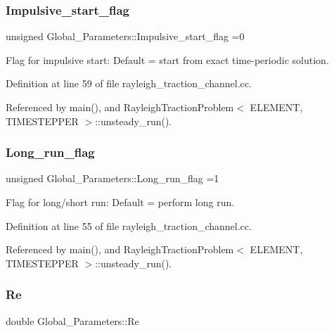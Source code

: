 \subsubsection{\texorpdfstring{Impulsive\+\_\+start\+\_\+flag}{Impulsive\_start\_flag}}
{\footnotesize\ttfamily unsigned Global\+\_\+\+Parameters\+::\+Impulsive\+\_\+start\+\_\+flag =0}



Flag for impulsive start\+: Default = start from exact time-\/periodic solution. 



Definition at line 59 of file rayleigh\+\_\+traction\+\_\+channel.\+cc.



Referenced by main(), and Rayleigh\+Traction\+Problem$<$ E\+L\+E\+M\+E\+N\+T, T\+I\+M\+E\+S\+T\+E\+P\+P\+E\+R $>$\+::unsteady\+\_\+run().

\mbox{\label{namespaceGlobal__Parameters_a457472b8222bb6bb0d97b2aed78d1ef4}} 
\subsubsection{\texorpdfstring{Long\+\_\+run\+\_\+flag}{Long\_run\_flag}}
{\footnotesize\ttfamily unsigned Global\+\_\+\+Parameters\+::\+Long\+\_\+run\+\_\+flag =1}



Flag for long/short run\+: Default = perform long run. 



Definition at line 55 of file rayleigh\+\_\+traction\+\_\+channel.\+cc.



Referenced by main(), and Rayleigh\+Traction\+Problem$<$ E\+L\+E\+M\+E\+N\+T, T\+I\+M\+E\+S\+T\+E\+P\+P\+E\+R $>$\+::unsteady\+\_\+run().

\mbox{\label{namespaceGlobal__Parameters_a9d72e94a9305c6a310940a6a427ebe06}} 
\subsubsection{\texorpdfstring{Re}{Re}}
{\footnotesize\ttfamily double Global\+\_\+\+Parameters\+::\+Re}



